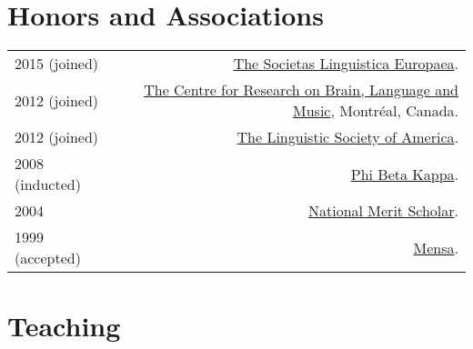 \documentclass[11pt,letterpaper,twoside]{article}
\makeatletter
\newcommand{\myvrule}{\color{lightgray}\vrule width 1.0pt}
\newenvironment{cvsection}{%
  \renewcommand{\arraystretch}{1.75}
  \begin{longtable}[l]{@{} L R @{}}
}{%
  \end{longtable}
}
\makeatother
\begin{document}
\section*{Honors and Associations}

\begin{cvsection}
  2015 {\footnotesize (joined)} & \href{http://www.societaslinguistica.eu/}{The
    Societas Linguistica Europaea}. \\

  2012 {\footnotesize (joined)} & \href{http://www.crblm.ca/}{The Centre for
    Research on Brain, Language and Music}, Montr\'{e}al, Canada. \\

  2012 {\footnotesize (joined)} &
  \href{http://www.linguisticsociety.org/}{The Linguistic Society of America}. \\

  2008 {\footnotesize (inducted)} & \href{http://www.pbk.org/}{Phi Beta Kappa}. \\

  2004 & \href{http://www.nationalmerit.org/}{National Merit Scholar}. \\

  1999 {\footnotesize (accepted)} & \href{http://www.mensa.org/}{Mensa}. \\
\end{cvsection}

\section*{Teaching}
\end{document}
